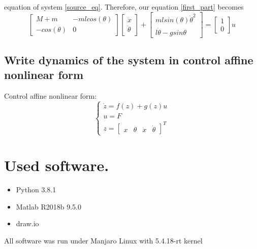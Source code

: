 \documentclass[a4paper,12pt]{article}
\begin{document}
    equation of system \ref{source_eq}. Therefore, our equation \ref{first_part}
    becomes
    \begin{equation}
        \begin{bmatrix}
            M+m & -mlcos(\theta) \\
            -cos(\theta) & 0
        \end{bmatrix}
        \begin{bmatrix}
            \ddot x \\ 
            \ddot\theta
        \end{bmatrix}
        +
        \begin{bmatrix}
            mlsin(\theta)\dot\theta^2\\
            l\dot\theta-gsin\theta
        \end{bmatrix}
        = 
        \begin{bmatrix}
            1\\
            0
        \end{bmatrix}u
    \end{equation}
    \subsection{Write dynamics of the system in control affine nonlinear form}
    Control affine nonlinear form:
    \begin{equation}
        \begin{cases}
            \dot z = f(z) + g(z)u\\
            u=F\\
            z = 
            \begin{bmatrix}
                x&
                \theta&
                \dot x&
                \dot \theta    
            \end{bmatrix}^T
        \end{cases}
    \end{equation}
    
\section{Used software.}
\begin{itemize}
    \item Python 3.8.1
    \item Matlab R2018b 9.5.0
    \item draw.io
\end{itemize}
All software was run under Manjaro Linux with 5.4.18-rt kernel
\end{document}
